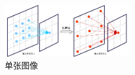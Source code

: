 \begin{figure}[h]
	\centering
	\includegraphics[width=0.5\textwidth]{image/illustration/hole.pdf}
	\caption{单张图像}
 	\label{fig:hole}
\end{figure}
